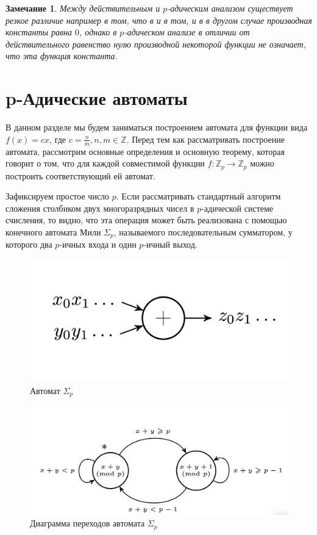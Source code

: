 \documentclass[och, master]{SCWorks}
\theoremstyle{plain}
\theoremstyle{plain}
\theoremstyle{plain}
\newtheorem{note}{Замечание}
\theoremstyle{definition}
\begin{document}
\begin{note}
Между действительным и $p$-адическим анализом существует резкое различие например в том, что в и в том, и в в другом случае производная константы равна $0$, однако в $p$-адическом анализе в отличии от действительного равенство нулю производной некоторой функции не означает, что эта функция константа.
\end{note}

\section{p-Адические автоматы}

В данном разделе мы будем заниматься построением автомата для функции вида $f(x)=cx$, где $c=\frac{n}{m}, n,m \in \mathbb Z$. Перед тем как рассматривать построение автомата, рассмотрим основные определения \cite{bib:automata:phd} и основную теорему, которая говорит о том, что для каждой совместимой функции $f: \mathbb {Z}_p \rightarrow \mathbb {Z}_p$ можно построить соответствующий ей автомат.

Зафиксируем простое число $p$. Если рассматривать стандартный алгоритм сложения столбиком двух многоразрядных чисел в $p$-адической системе счисления, то видно, что эта операция может быть реализована с помощью конечного автомата Мили $\Sigma_p$, называемого последовательным сумматором, у которого два $p$-ичных входа и один $p$-ичный выход.


\begin{figure}[H]
\centerline{\includegraphics[width=0.5\linewidth]{img/automata_1}}
\caption{Автомат $\Sigma_p$}
\label{img:automata:1}
\end{figure}

\begin{figure}[H]
\centerline{\includegraphics[width=0.5\linewidth]{img/automata_2}}
\caption{Диаграмма переходов автомата $\Sigma_p$}
\label{img:automata:2}
\end{figure}
\end{document}
